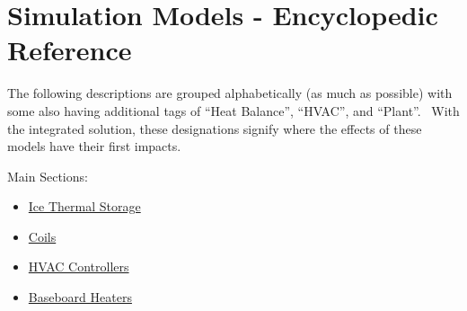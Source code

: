 \chapter{Simulation Models - Encyclopedic Reference}\label{simulation-models---encyclopedic-reference}

The following descriptions are grouped alphabetically (as much as possible) with some also having additional tags of ``Heat Balance'', ``HVAC'', and ``Plant''.~ With the integrated solution, these designations signify where the effects of these models have their first impacts.

Main Sections:

\begin{itemize}
\tightlist
\item
  \protect\hyperlink{IceStorage}{Ice Thermal Storage}
\item
  \protect\hyperlink{Coils}{Coils}
\item
  \protect\hyperlink{Controllers}{HVAC Controllers}
\item
  \protect\hyperlink{Baseboards}{Baseboard Heaters} 
\end{itemize}
